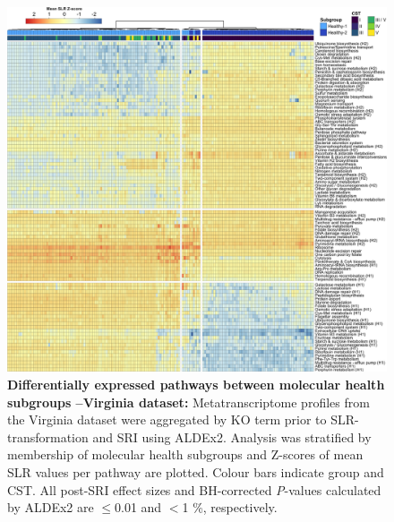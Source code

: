 \documentclass[sn-mathphys,Numbered]{sn-jnl}%
\begin{document}
\begin{figure}[H]
    \centering
    \includegraphics[scale = 0.77]{0_supplFig10.png}
    \caption{\textbf{Differentially expressed pathways between molecular health subgroups --Virginia dataset:} Metatranscriptome profiles from the Virginia dataset were aggregated by KO term prior to SLR-transformation and SRI using ALDEx2. Analysis was stratified by membership of molecular health subgroups and Z-scores of mean SLR values per pathway are plotted. Colour bars indicate group and CST. All post-SRI effect sizes and BH-corrected \textit{P}-values calculated by ALDEx2 are $\leq$0.01 and $<$1 \%, respectively.} \label{fig:sfigVirgHsubgroups}
\end{figure}
\newpage

\end{document}
